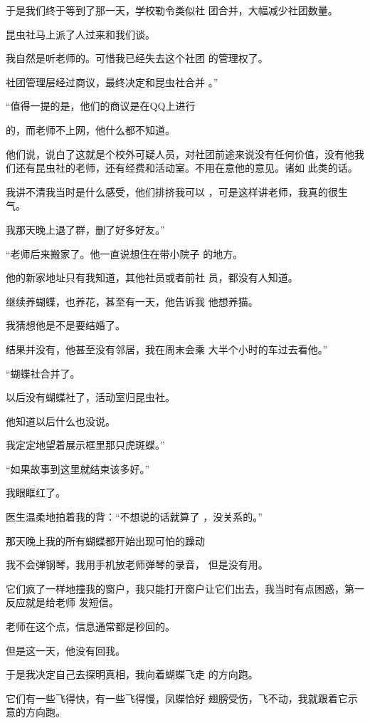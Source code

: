 \documentclass{article}
\begin{document}
于是我们终于等到了那一天，学校勒令类似社
团合并，大幅减少社团数量。 


昆虫社马上派了人过来和我们谈。 

我自然是听老师的。可惜我已经失去这个社团
的管理权了。 

社团管理层经过商议，最终决定和昆虫社合并
。” 

“值得一提的是，他们的商议是在QQ上进行
\newpage

的，而老师不上网，他什么都不知道。 

他们说，说白了这就是个校外可疑人员，对社团前途来说没有任何价值，没有他我们还有昆虫社的老师，还有经费和活动室。不用在意他的意见。诸如
此类的话。 

我讲不清我当时是什么感受，他们排挤我可以
，可是这样讲老师，我真的很生气。 


我那天晚上退了群，删了好多好友。” 

“老师后来搬家了。他一直说想住在带小院子
的地方。 

他的新家地址只有我知道，其他社员或者前社
员，都没有人知道。 

继续养蝴蝶，也养花，甚至有一天，他告诉我
他想养猫。 

\newpage


我猜想他是不是要结婚了。 

结果并没有，他甚至没有邻居，我在周末会乘
大半个小时的车过去看他。” 


“蝴蝶社合并了。 


以后没有蝴蝶社了，活动室归昆虫社。 


他知道以后什么也没说。 


我定定地望着展示框里那只虎斑蝶。” 


“如果故事到这里就结束该多好。” 


我眼眶红了。 

医生温柔地拍着我的背：“不想说的话就算了
，没关系的。” 

那天晚上我的所有蝴蝶都开始出现可怕的躁动
\newpage


我不会弹钢琴，我用手机放老师弹琴的录音，
但是没有用。 

它们疯了一样地撞我的窗户，我只能打开窗户让它们出去，我当时有点困惑，第一反应就是给老师
发短信。 


老师在这个点，信息通常都是秒回的。 


但是这一天，他没有回我。 

于是我决定自己去探明真相，我向着蝴蝶飞走
的方向跑。 

它们有一些飞得快，有一些飞得慢，凤蝶恰好
翅膀受伤，飞不动，我就跟着它示意的方向跑。 
\end{document}

